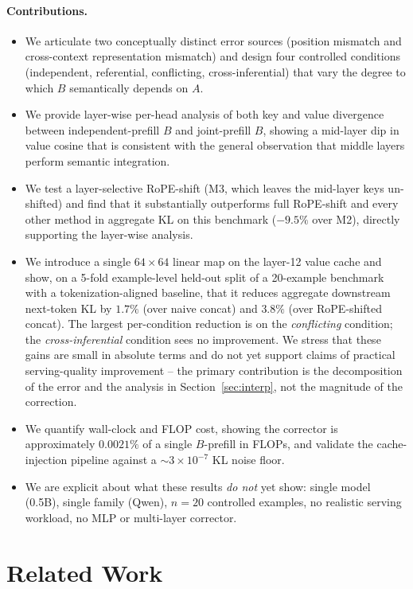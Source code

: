 \documentclass[11pt]{article}
\begin{document}
\paragraph{Contributions.}
\begin{itemize}[leftmargin=*]
    \item We articulate two conceptually distinct error sources (position mismatch and cross-context representation mismatch) and design four controlled conditions (independent, referential, conflicting, cross-inferential) that vary the degree to which $B$ semantically depends on $A$.
    \item We provide layer-wise per-head analysis of both key and value divergence between independent-prefill $B$ and joint-prefill $B$, showing a mid-layer dip in value cosine that is consistent with the general observation that middle layers perform semantic integration.
    \item We test a layer-selective RoPE-shift (M3, which leaves the mid-layer keys un-shifted) and find that it substantially outperforms full RoPE-shift and every other method in aggregate KL on this benchmark ($-9.5\%$ over M2), directly supporting the layer-wise analysis.
    \item We introduce a single $64\times64$ linear map on the layer-12 value cache and show, on a 5-fold example-level held-out split of a 20-example benchmark with a tokenization-aligned baseline, that it reduces aggregate downstream next-token KL by $1.7\%$ (over naive concat) and $3.8\%$ (over RoPE-shifted concat). The largest per-condition reduction is on the \emph{conflicting} condition; the \emph{cross-inferential} condition sees no improvement. We stress that these gains are small in absolute terms and do not yet support claims of practical serving-quality improvement -- the primary contribution is the decomposition of the error and the analysis in Section~\ref{sec:interp}, not the magnitude of the correction.
    \item We quantify wall-clock and FLOP cost, showing the corrector is approximately $0.0021\%$ of a single $B$-prefill in FLOPs, and validate the cache-injection pipeline against a $\sim 3\times10^{-7}$ KL noise floor.
    \item We are explicit about what these results \emph{do not} yet show: single model (0.5B), single family (Qwen), $n=20$ controlled examples, no realistic serving workload, no MLP or multi-layer corrector.
\end{itemize}

\section{Related Work}
\end{document}
